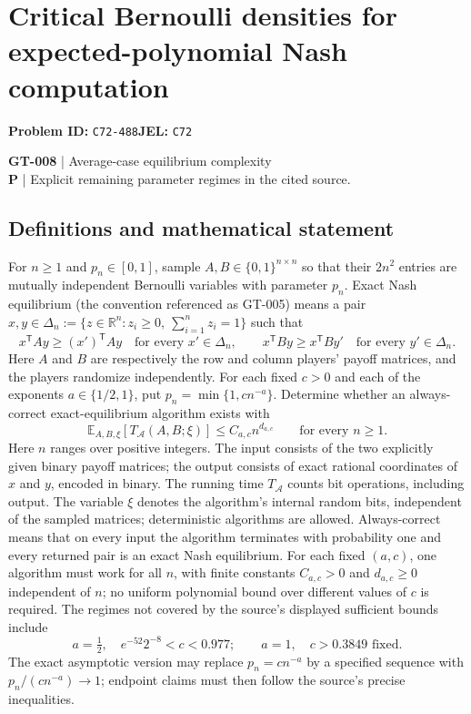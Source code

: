\documentclass[11pt,a4paper]{article}
\newcommand{\R}{\mathbb R}
\begin{document}
\section*{Critical Bernoulli densities for expected-polynomial Nash computation}
\textbf{Problem ID:} \texttt{C72-488}\quad \textbf{JEL:} \texttt{C72}\par
\label{problem:OP-0138}
\label{game:GT-008}
{\sffamily\small\color{muted}
\textbf{GT-008} | Average-case equilibrium complexity\\
\textbf{P} | Explicit remaining parameter regimes in the cited source.
\par}
\subsection*{Definitions and mathematical statement}
For $n\geq1$ and $p_n\in[0,1]$, sample $A,B\in\{0,1\}^{n\times n}$ so that their $2n^2$ entries are mutually independent Bernoulli variables with parameter $p_n$. Exact Nash equilibrium (the convention referenced as GT-005) means a pair $x,y\in\Delta_n:=\{z\in\R^n:z_i\geq0,\ \sum_{i=1}^n z_i=1\}$ such that
\[
 x^{\mathsf T}Ay\geq (x')^{\mathsf T}Ay\quad\text{for every }x'\in\Delta_n,
 \qquad
 x^{\mathsf T}By\geq x^{\mathsf T}By'\quad\text{for every }y'\in\Delta_n.
\]
Here $A$ and $B$ are respectively the row and column players' payoff matrices, and the players randomize independently. For each fixed $c>0$ and each of the exponents $a\in\{1/2,1\}$, put $p_n=\min\{1,cn^{-a}\}$. Determine whether an always-correct exact-equilibrium algorithm exists with
\[
 \mathbb E_{A,B,\xi}[T_{\mathcal A}(A,B;\xi)]\leq C_{a,c}n^{d_{a,c}}
 \qquad\text{for every }n\geq1.
\]
Here $n$ ranges over positive integers. The input consists of the two explicitly given binary payoff matrices; the output consists of exact rational coordinates of $x$ and $y$, encoded in binary. The running time $T_{\mathcal A}$ counts bit operations, including output. The variable $\xi$ denotes the algorithm's internal random bits, independent of the sampled matrices; deterministic algorithms are allowed. Always-correct means that on every input the algorithm terminates with probability one and every returned pair is an exact Nash equilibrium. For each fixed $(a,c)$, one algorithm must work for all $n$, with finite constants $C_{a,c}>0$ and $d_{a,c}\geq0$ independent of $n$; no uniform polynomial bound over different values of $c$ is required.
The regimes not covered by the source's displayed sufficient bounds include
\[
 a=\tfrac12,\quad e^{-52}2^{-8}<c<0.977;
 \qquad a=1,\quad c>0.3849\text{ fixed}.
\]
The exact asymptotic version may replace $p_n=cn^{-a}$ by a specified sequence with $p_n/(cn^{-a})\to1$; endpoint claims must then follow the source's precise inequalities.
\end{document}

